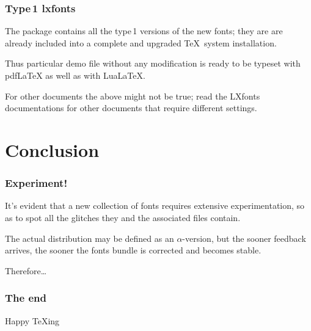\documentclass[usepdftitle=false]{beamer}\errorcontextlines=9
\begin{document}
\begin{frame}\frametitle{Type\,1 lxfonts}
The package contains all the type\,1 versions of the new fonts; they are are already included into a complete and upgraded \TeX\ system installation. 

Thus particular demo file without any modification is ready to be typeset with \alert{pdfLaTeX} as well as with \alert{LuaLaTeX}.

For other documents the above might not be true; read the LXfonts documentations for other documents that require different settings.
\end{frame}






\section{Conclusion}

\begin{frame}\frametitle{Experiment!}
It's evident that a new collection of fonts requires extensive experimentation, so as to spot all the glitches they and the associated files contain.

\medskip

The actual distribution may be defined as an $\alpha$-version, but the sooner feedback arrives, the sooner the fonts bundle is corrected and becomes stable.

\medskip

Therefore\dots
\end{frame}

\begin{frame}\frametitle{The end}
\begin{center}
\fontsize{37}{35}\selectfont Happy TeXing\\ 

\end{center}
\end{frame}
\end{document}
